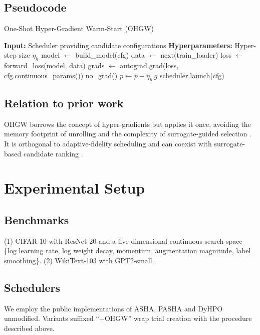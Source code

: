 \documentclass{article}
\begin{document}
\subsection{Pseudocode}
\begin{algorithm}[H]
\caption{One-Shot Hyper-Gradient Warm-Start (OHGW)}
\begin{algorithmic}
  \State \textbf{Input:} Scheduler providing candidate configurations
  \State \textbf{Hyperparameters:} Hyper-step size \(\eta_h\)
    \State model \(\leftarrow\) build\_model(cfg)
    \State data \(\leftarrow\) next(train\_loader) 
    \State loss \(\leftarrow\) forward\_loss(model, data)
    \State grads \(\leftarrow\) autograd.grad(loss, cfg.continuous\_params())
    \State no\_grad() 
      \State \(p \leftarrow p - \eta_h\, g\)
    \EndFor
    \State scheduler.launch(cfg) 
  \EndFor
\end{algorithmic}
\end{algorithm}

\subsection{Relation to prior work}
OHGW borrows the concept of hyper-gradients but applies it once, avoiding the memory footprint of unrolling \cite{bertrand-2020-implicit} and the complexity of surrogate-guided selection \cite{nguyen-2019-bayesian}. It is orthogonal to adaptive-fidelity scheduling \cite{jiang-2024-efficient} and can coexist with surrogate-based candidate ranking \cite{khazi-2023-deep}.

\section{Experimental Setup}
\subsection{Benchmarks}
(1) CIFAR-10 with ResNet-20 and a five-dimensional continuous search space \{log learning rate, log weight decay, momentum, augmentation magnitude, label smoothing\}. (2) WikiText-103 with GPT2-small.

\subsection{Schedulers}
We employ the public implementations of ASHA, PASHA and DyHPO \cite{bohdal-2022-pasha,wistuba-2022-supervising} unmodified. Variants suffixed ``+OHGW'' wrap trial creation with the procedure described above.
\end{document}
